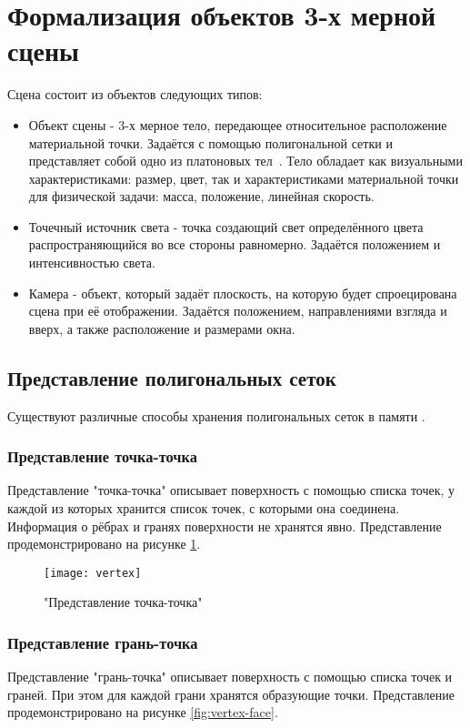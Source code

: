 \section{Формализация объектов 3-х мерной сцены}

Сцена состоит из объектов следующих типов:
\begin{itemize}
	\item Объект сцены - 3-х мерное тело, передающее относительное расположение материальной точки. Задаётся с помощью полигональной сетки и представляет собой одно из платоновых тел~\cite{platon-body}. Тело обладает как визуальными характеристиками: размер, цвет, так и характеристиками материальной точки для физической задачи: масса, положение, линейная скорость.
	\item Точечный источник света - точка создающий свет определённого цвета распространяющийся во все стороны равномерно. Задаётся положением и интенсивностью света.
	\item Камера - объект, который задаёт плоскость, на которую будет спроецирована сцена при её отображении. Задаётся положением, направлениями взгляда и вверх, а также расположение и размерами окна.
\end{itemize}


\subsection{Представление полигональных сеток}
Существуют различные способы хранения полигональных сеток в памяти \cite{colins}.

\subsubsection{Представление точка-точка}
Представление "точка-точка" описывает поверхность с помощью списка точек, у каждой из которых хранится список точек, с которыми она соединена. Информация о рёбрах и гранях поверхности не хранятся явно. Представление продемонстрировано на рисунке \ref{fig:vertex-vertex}.

\begin{figure}
	\centering
	\texttt{[image: vertex]}
	\caption{"Представление точка-точка"}
	\label{fig:vertex-vertex}
\end{figure}


\subsubsection{Представление грань-точка}
Представление "грань-точка" описывает поверхность с помощью списка точек и граней. При этом для каждой грани хранятся образующие точки. Представление продемонстрировано на рисунке \ref{fig:vertex-face}.

